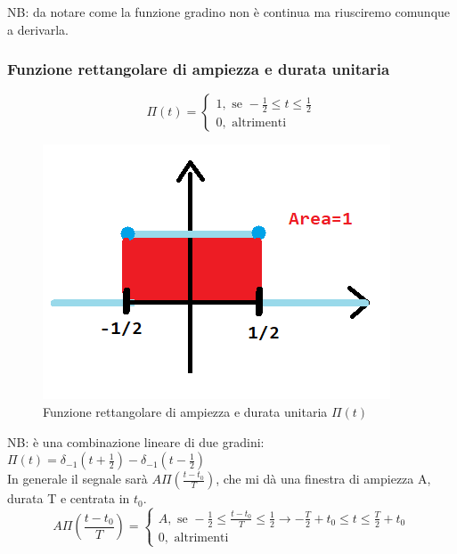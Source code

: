 	NB: da notare come la funzione gradino non è continua ma riusciremo comunque a derivarla.\\

\subsubsection{Funzione rettangolare di ampiezza e durata unitaria}
	
	\begin{equation*}
	\varPi(t)=
	\begin{cases} 
	1, \mbox{ se } -\frac{1}{2} \leq t \leq \frac{1}{2}\\ 
	0, \mbox{ altrimenti }
	\end{cases} 
	\end{equation*}
	
	\begin{figure}[h]
		\centering
		\includegraphics[scale=0.5]{immagini/rettangolo}
		\caption{ Funzione rettangolare di ampiezza e durata unitaria $ \varPi(t) $ }
		\label{fig: rettangolo}
	\end{figure}
	
	NB: è una combinazione lineare di due gradini:\\
	$ \varPi(t)= \delta_{-1}(t + \frac{1}{2}) - \delta_{-1}(t-\frac{1}{2}) $\\
	
	In generale il segnale sarà $ A \varPi( \frac{t-t_0}{T}) $, che mi dà una finestra di ampiezza A, durata T e centrata in $t_0$.\\
	
	\begin{equation*}
	A \varPi( \frac{t-t_0}{T})=
	\begin{cases} 
	A, \mbox{ se } -\frac{1}{2} \leq \frac{t-t_0}{T} \leq \frac{1}{2} \rightarrow -\frac{T}{2}+t_0 \leq t \leq \frac{T}{2}+ t_0 \\ 
	0, \mbox{ altrimenti }
	\end{cases} 
	\end{equation*}
	

